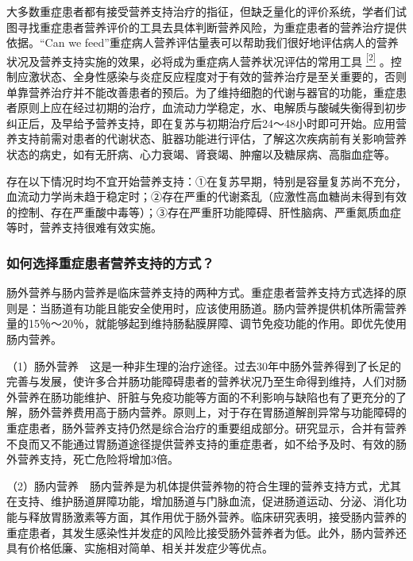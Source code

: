 大多数重症患者都有接受营养支持治疗的指征，但缺乏量化的评价系统，学者们试图寻找重症患者营养评价的工具去具体判断营养风险，为重症患者的营养治疗提供依据。“Can
we
feed”重症病人营养评估量表可以帮助我们很好地评估病人的营养状况及营养支持实施的效果，必将成为重症病人营养状况评估的常用工具
\protect\hyperlink{text00028.htmlux5cux23ch2-27}{\textsuperscript{{[}2{]}}}
。控制应激状态、全身性感染与炎症反应程度对于有效的营养治疗是至关重要的，否则单靠营养治疗并不能改善患者的预后。为了维持细胞的代谢与器官的功能，重症患者原则上应在经过初期的治疗，血流动力学稳定，水、电解质与酸碱失衡得到初步纠正后，及早给予营养支持，即在复苏与初期治疗后24～48小时即可开始。应用营养支持前需对患者的代谢状态、脏器功能进行评估，了解这次疾病前有关影响营养状态的病史，如有无肝病、心力衰竭、肾衰竭、肿瘤以及糖尿病、高脂血症等。

存在以下情况时均不宜开始营养支持：①在复苏早期，特别是容量复苏尚不充分，血流动力学尚未趋于稳定时；②存在严重的代谢紊乱（应激性高血糖尚未得到有效的控制、存在严重酸中毒等）；③存在严重肝功能障碍、肝性脑病、严重氮质血症等时，营养支持很难有效实施。

\subsubsection{如何选择重症患者营养支持的方式？}

肠外营养与肠内营养是临床营养支持的两种方式。重症患者营养支持方式选择的原则是：当肠道有功能且能安全使用时，应该使用肠道。肠内营养提供机体所需营养量的15％～20％，就能够起到维持肠黏膜屏障、调节免疫功能的作用。即优先使用肠内营养。

（1）肠外营养　这是一种非生理的治疗途径。过去30年中肠外营养得到了长足的完善与发展，使许多合并肠功能障碍患者的营养状况乃至生命得到维持，人们对肠外营养在肠功能维护、肝脏与免疫功能等方面的不利影响与缺陷也有了更充分的了解，肠外营养费用高于肠内营养。原则上，对于存在胃肠道解剖异常与功能障碍的重症患者，肠外营养支持仍然是综合治疗的重要组成部分。研究显示，合并有营养不良而又不能通过胃肠道途径提供营养支持的重症患者，如不给予及时、有效的肠外营养支持，死亡危险将增加3倍。

（2）肠内营养　肠内营养是为机体提供营养物的符合生理的营养支持方式，尤其在支持、维护肠道屏障功能，增加肠道与门脉血流，促进肠道运动、分泌、消化功能与释放胃肠激素等方面，其作用优于肠外营养。临床研究表明，接受肠内营养的重症患者，其发生感染性并发症的风险比接受肠外营养者为低。此外，肠内营养还具有价格低廉、实施相对简单、相关并发症少等优点。

